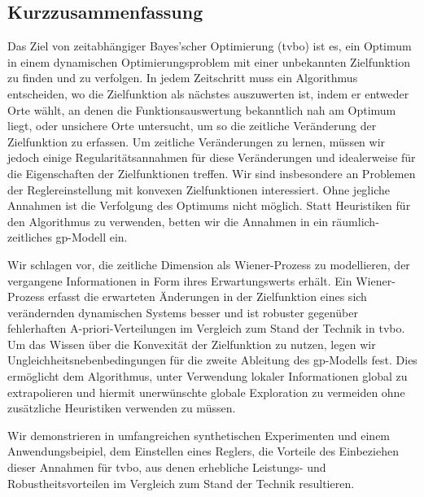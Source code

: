 \subsection*{Kurzzusammenfassung}
Das Ziel von zeitabhängiger Bayes'scher Optimierung (\acrshort{tvbo}) ist es, ein Optimum in einem dynamischen Optimierungsproblem mit einer unbekannten Zielfunktion zu finden und zu verfolgen. In jedem Zeitschritt muss ein Algorithmus entscheiden, wo die Zielfunktion als nächstes auszuwerten ist, indem er entweder Orte wählt, an denen die Funktionsauswertung bekanntlich nah am Optimum liegt, oder unsichere Orte untersucht, um so die zeitliche Veränderung der Zielfunktion zu erfassen. Um zeitliche Veränderungen zu lernen, müssen wir jedoch einige Regularitätsannahmen für diese Veränderungen und idealerweise für die Eigenschaften der Zielfunktionen treffen. Wir sind insbesondere an Problemen der Reglereinstellung mit konvexen Zielfunktionen interessiert. Ohne jegliche Annahmen ist die Verfolgung des Optimums nicht möglich. Statt Heuristiken für den Algorithmus zu verwenden, betten wir die Annahmen in ein räumlich-zeitliches \acrshort{gp}-Modell ein.

Wir schlagen vor, die zeitliche Dimension als Wiener-Prozess zu modellieren, der vergangene Informationen in Form ihres Erwartungswerts erhält. Ein Wiener-Prozess erfasst die erwarteten Änderungen in der Zielfunktion eines sich verändernden dynamischen Systems besser und ist robuster gegenüber fehlerhaften A-priori-Verteilungen im Vergleich zum Stand der Technik in \acrshort{tvbo}. Um das Wissen über die Konvexität der Zielfunktion zu nutzen, legen wir Ungleichheitsnebenbedingungen für die zweite Ableitung des \acrshort{gp}-Modells fest. Dies ermöglicht dem Algorithmus, unter Verwendung lokaler Informationen global zu extrapolieren und hiermit unerwünschte globale Exploration zu vermeiden ohne zusätzliche Heuristiken verwenden zu müssen.

Wir demonstrieren in umfangreichen synthetischen Experimenten und einem Anwendungsbeipiel, dem Einstellen eines Reglers, die Vorteile des Einbeziehen dieser Annahmen für \acrshort{tvbo}, aus denen erhebliche Leistungs- und Robustheitsvorteilen im Vergleich zum Stand der Technik resultieren. 

\glsresetall
